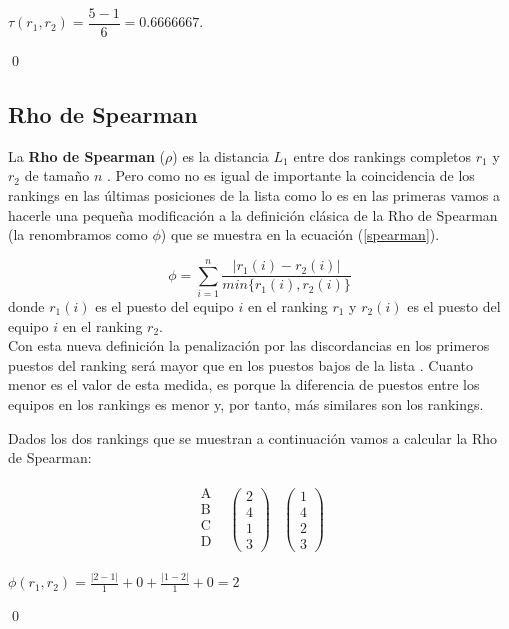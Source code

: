 \begin{center}
$ \tau (r_{1},r_{2}) = \dfrac{5-1}{6}=0.6666667$.
\end{center}
\qed

\subsection{Rho de Spearman}
La \textbf{Rho de Spearman} ($\rho$) es la distancia $L_{1}$ entre dos rankings completos $r_{1}$ y $r_{2}$ de tamaño $n$ \cite[pág 206]{comparacion}. Pero como no es igual de importante la coincidencia de los rankings en las últimas posiciones de la lista como lo es en las primeras vamos a hacerle una pequeña modificación a la definición clásica de la Rho de Spearman (la renombramos como $\phi$) que se muestra en la ecuación (\ref{spearman}). 

\begin{equation} \label{spearman}
	\phi = \sum_{i=1}^{n} \dfrac{|r_{1}(i) - r_{2}(i)|}{min\{r_{1}(i),r_{2}(i)\}}
\end{equation}
donde $r_{1}(i)$ es el puesto del equipo $i$ en el ranking $r_{1}$ y $r_{2}(i)$ es el puesto del equipo $i$ en el ranking $r_{2}$.\\

Con esta nueva definición la penalización por las discordancias en los primeros puestos del ranking será mayor que en los puestos bajos de la lista \cite[pág 207]{comparacion}. Cuanto menor es el valor de esta medida, es porque la diferencia de puestos entre los equipos en los rankings es menor y, por tanto, más similares son los rankings.


\begin{ejem} Dados los dos rankings que se muestran a continuación vamos a calcular la Rho de Spearman:
\end{ejem}
\begin{center}
	\[
	\begin{array}{ccc}
	\begin{array}{c}
	\text{A}\\
	\text{B} \\
	\text{C} \\
	\text{D} \\
	\end{array} & \left(\begin{array}{c}
	2\\
	4\\
	1\\
	3
	\end{array} \right)& \left(\begin{array}{c}
	1\\
	4\\
	2\\
	3
	\end{array} \right)
	\end{array}  
	\]
	
	$ \phi (r_{1},r_{2}) = \frac{|2-1|}{1} + 0 + \frac{|1-2|}{1} + 0 = 2$
	
\end{center}

\qed